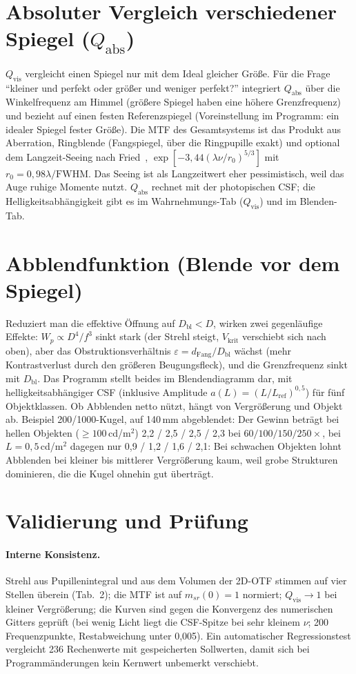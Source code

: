 \documentclass[11pt,a4paper]{article}
\newcommand{\Qvis}{Q_{\mathrm{vis}}}
\newcommand{\Vkrit}{V_{\mathrm{krit}}}
\begin{document}
\section{Absoluter Vergleich verschiedener Spiegel (\texorpdfstring{$Q_{\mathrm{abs}}$}{Qabs})}
$\Qvis$ vergleicht einen Spiegel nur mit dem Ideal gleicher Größe. Für die Frage ``kleiner und perfekt oder größer und weniger perfekt?'' integriert $Q_{\mathrm{abs}}$ über die Winkelfrequenz am Himmel (größere Spiegel haben eine höhere Grenzfrequenz) und bezieht auf einen festen Referenzspiegel (Voreinstellung im Programm: ein idealer Spiegel fester Größe). Die MTF des Gesamtsystems ist das Produkt aus Aberration, Ringblende (Fangspiegel, über die Ringpupille exakt) und optional dem Langzeit-Seeing nach Fried~\cite{fried}, $\exp[-3{,}44(\lambda\nu/r_0)^{5/3}]$ mit $r_0=0{,}98\lambda/\mathrm{FWHM}$. Das Seeing ist als Langzeitwert eher pessimistisch, weil das Auge ruhige Momente nutzt. $Q_{\mathrm{abs}}$ rechnet mit der photopischen CSF; die Helligkeitsabhängigkeit gibt es im Wahrnehmungs-Tab ($\Qvis$) und im Blenden-Tab.

\section{Abblendfunktion (Blende vor dem Spiegel)}
Reduziert man die effektive Öffnung auf $D_{\mathrm{bl}}<D$, wirken zwei gegenläufige Effekte: $W_p\propto D^4/f^3$ sinkt stark (der Strehl steigt, $\Vkrit$ verschiebt sich nach oben), aber das Obstruktionsverhältnis $\varepsilon=d_{\mathrm{Fang}}/D_{\mathrm{bl}}$ wächst (mehr Kontrastverlust durch den größeren Beugungsfleck), und die Grenzfrequenz sinkt mit $D_{\mathrm{bl}}$. Das Programm stellt beides im Blendendiagramm dar, mit helligkeitsabhängiger CSF (inklusive Amplitude $a(L)=(L/L_{\mathrm{ref}})^{0{,}5}$) für fünf Objektklassen. Ob Abblenden netto nützt, hängt von Vergrößerung und Objekt ab. Beispiel 200/1000-Kugel, auf 140\,mm abgeblendet: Der Gewinn beträgt bei hellen Objekten ($\ge100$\,cd/m$^2$) 2,2 / 2,5 / 2,5 / 2,3 bei $60/100/150/250\times$, bei $L=0{,}5$\,cd/m$^2$ dagegen nur 0,9 / 1,2 / 1,6 / 2,1: Bei schwachen Objekten lohnt Abblenden bei kleiner bis mittlerer Vergrößerung kaum, weil grobe Strukturen dominieren, die die Kugel ohnehin gut überträgt.

\section{Validierung und Prüfung}
\paragraph{Interne Konsistenz.} Strehl aus Pupillenintegral und aus dem Volumen der 2D-OTF stimmen auf vier Stellen überein (Tab.~2); die MTF ist auf $m_{sr}(0)=1$ normiert; $\Qvis\to1$ bei kleiner Vergrößerung; die Kurven sind gegen die Konvergenz des numerischen Gitters geprüft (bei wenig Licht liegt die CSF-Spitze bei sehr kleinem $\nu$; 200 Frequenzpunkte, Restabweichung unter 0,005). Ein automatischer Regressionstest vergleicht 236 Rechenwerte mit gespeicherten Sollwerten, damit sich bei Programmänderungen kein Kernwert unbemerkt verschiebt.
\end{document}
